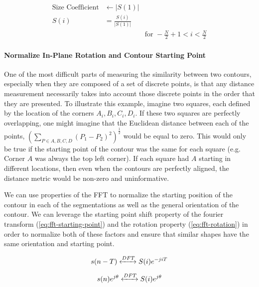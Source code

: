 \begin{equation}
    \begin{aligned}
        \text{Size Coefficient} &\leftarrow |S(1)| \\
        S(i) &= \frac{S(i)}{|S(1)|} & \\
        & & \text{for } -\frac{N}{2} + 1 < i < \frac{N}{2}
    \end{aligned}
\end{equation}


\paragraph*{Normalize In-Plane Rotation and Contour Starting Point}

One of the most difficult parts of measuring the similarity between two contours, especially when they are composed of a set of discrete points, is that any distance measurement necessarily takes into account those discrete points in the order that they are presented. To illustrate this example, imagine two squares, each defined by the location of the corners $A_i,B_i,C_i,D_i$. If these two squares are perfectly overlapping, one might imagine that the Euclidean distance between each of the points, $(\sum_{P \in A,B,C,D} (P_1 - P_2)^2)^{\frac{1}{2}}$ would be equal to zero. This would only be true if the starting point of the contour was the same for each square (e.g. Corner $A$ was always the top left corner). If each square had $A$ starting in different locations, then even when the contours are perfectly aligned, the distance metric would be non-zero and uninformative. 

We can use properties of the FFT to normalize the starting position of the contour in each of the segmentations as well as the general orientation of the contour. We can leverage the starting point shift property of the fourier transform (\cref{eq:fft-starting-point}) and the rotation property (\cref{eq:fft-rotation}) in order to normalize both of these factors and ensure that similar shapes have the same orientation and starting point. 

\begin{equation}
    s(n-T) \xleftrightarrow[]{DFT} S(i)e^{-jiT}
    \label{eq:fft-starting-point}
\end{equation}

\begin{equation}
    s(n)e^{j\theta} \xleftrightarrow[]{DFT} S(i)e^{j\theta}
    \label{eq:fft-rotation}
\end{equation}

